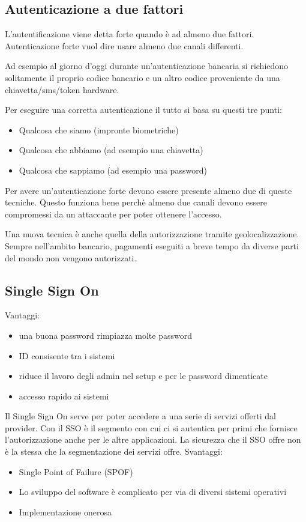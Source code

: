 \subsection{Autenticazione a due fattori}

L'autentificazione viene detta forte quando è ad almeno due fattori.
Autenticazione forte vuol dire usare almeno due canali differenti.

Ad esempio al giorno d'oggi durante un'autenticazione bancaria si richiedono
solitamente il proprio codice bancario e un altro codice proveniente da una
chiavetta/sms/token hardware.

Per eseguire una corretta autenticazione il tutto si basa su questi tre punti:
\begin{itemize}
 \item Qualcosa che siamo (impronte biometriche)
 \item Qualcosa che abbiamo (ad esempio una chiavetta)
 \item Qualcosa che sappiamo (ad esempio una password)
\end{itemize}

Per avere un'autenticazione forte devono essere presente almeno due di queste
tecniche. Questo funziona bene perchè almeno due canali devono essere
compromessi da un attaccante per poter ottenere l'accesso.

Una nuova tecnica è anche quella della autorizzazione tramite
geolocalizzazione. Sempre nell'ambito bancario, pagamenti eseguiti a breve
tempo da diverse parti del mondo non vengono autorizzati.

\subsection{Single Sign On}

Vantaggi:
\begin{itemize}
\item una buona password rimpiazza molte password
\item ID consisente tra i sistemi
\item riduce il lavoro degli admin nel setup e per le password dimenticate
\item accesso rapido ai sistemi
\end{itemize}


Il Single Sign On serve per poter accedere a una serie di servizi offerti dal
provider. Con il SSO è il segmento con cui ci si autentica per primi che
fornisce l'autorizzazione anche per le altre applicazioni.
La sicurezza che il SSO offre non è la stessa che la segmentazione dei servizi
offre.
Svantaggi:
\begin{itemize}
\item Single Point of Failure (SPOF)
\item Lo sviluppo del software è complicato per via di diversi sistemi operativi
\item Implementazione onerosa
\end{itemize}


